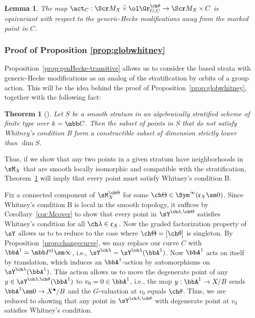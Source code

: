 \documentclass[final]{amsart}
\newtheorem{thm}[subsubsection]{Theorem}
\newtheorem{lem}[subsubsection]{Lemma}
\theoremstyle{remark}
\theoremstyle{definition}
\DeclareMathOperator*{\ttimes}{\tilde\times}
\DeclareMathOperator*{\xt}{\times}
\numberwithin{equation}{section}
\begin{document}
\begin{lem} \label{lem:act-equivariant}
The map $\act_C : \Scr M_X \ttimes \ol\Gr^{\ch\theta}_{G,C} \to \Scr M_X \xt C$ is equivariant with respect to the generic-Hecke modifications
away from the marked point in $C$. 
\end{lem}




\subsubsection{Proof of Proposition \ref{prop:globwhitney}} \label{proof:whitney}

Proposition~\ref{prop:genHecke-transitive} allows us to consider the based strata with 
generic-Hecke modifications
as an analog of the stratification by orbits of a group action. 
This will be the idea behind the proof of Proposition~\ref{prop:globwhitney}, together
with the following fact: 

\begin{thm}[{\cite[Theorem 2]{Kaloshin}}]  \label{thm:K}
Let $S$ be a smooth stratum in an algebraically stratified scheme of finite type over $k=\mbb C$. 
Then the subset of points in $S$ that do not satisfy Whitney's condition B 
form a constructible subset of dimension strictly lower than $\dim S$.
\end{thm}

Thus, if we show that any two points in a given stratum have neighborhoods in $\sM_X$ 
that are smooth locally isomorphic and compatible with the stratification, 
Theorem~\ref{thm:K} will imply that every point
must satisfy Whitney's condition B.

\smallskip

Fix a connected component of $\sM_X^{\ch\Theta}$ 
for some $\ch\Theta \in \Sym^\infty(\mathfrak c_X \sm 0)$. 
Since Whitney's condition B is local in the smooth topology, 
it suffices by Corollary~\ref{cor:Mcover} to show that every point in 
$\sY^{\ch\lambda,\ch\Theta}$
satisfies Whitney's condition for all $\ch\lambda \in \mathfrak c_X$.
Now the graded factorization property of $\sY$ allows us to 
to reduce to the case where $\ch\Theta = [\ch\theta]$ is singleton. 
By Proposition~\ref{prop:changecurve}, we may replace our curve $C$ 
with $\bbA^1 = \mbb P^1 \sm \infty$, i.e., $\sY^{\ch\lambda}=\sY^{\ch\lambda}(\bbA^1)$.
Now $\bbA^1$ acts on itself by translation, which induces
an $\bbA^1$-action by automorphisms on $\sY^{\ch\lambda}(\bbA^1)$. 
This action allows us to move the degenerate point of any 
$y \in \sY^{\ch\lambda,\ch\theta}(\bbA^1)$ to $v_0=0 \in \bbA^1$, i.e., 
the map $y:\bbA^1 \to X/B$ sends $\bbA^1 \sm 0 \to X^\bullet/B$ and 
the $G$-valuation at $v_0$ equals $\ch\theta$.
Thus, we are reduced to showing that any point in 
$\sY^{\ch\lambda,\ch\theta}$ with degenerate point at $v_0$ satisfies Whitney's condition.
\end{document}
